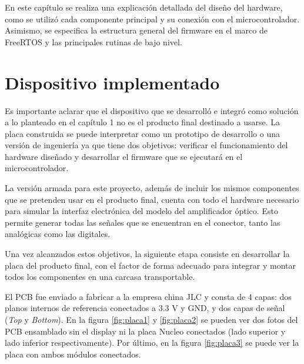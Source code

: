 
En este capítulo se realiza una explicación detallada del diseño del hardware, como se utilizó cada componente principal y su conexión con el microcontrolador. Asimismo, se especifica la estructura general del firmware en el marco de FreeRTOS y las principales rutinas de bajo nivel.

\section{Dispositivo implementado}

Es importante aclarar que el dispositivo que se desarrolló e integró como solución a lo planteado en el capítulo 1 no es el producto final destinado a usarse. La placa construida se puede interpretar como un prototipo de desarrollo o una versión de ingeniería ya que tiene dos objetivos: verificar el funcionamiento del hardware diseñado y desarrollar el firmware que se ejecutará en el microcontrolador. 

La versión armada para este proyecto, además de incluir los mismos componentes que se pretenden usar en el producto final, cuenta con todo el hardware necesario para simular la interfaz electrónica del modelo del amplificador óptico. Esto permite generar todas las señales que se encuentran en el conector, tanto las analógicas como las digitales.

Una vez alcanzados estos objetivos, la siguiente etapa consiste en desarrollar la placa del producto final, con el factor de forma adecuado para integrar y montar todos los componentes en una carcasa transportable. 

El PCB fue enviado a fabricar a la empresa china JLC y consta de 4 capas: dos planos internos de referencia conectados a 3.3 V y GND, y dos capas de señal (\textit{Top} y \textit{Bottom}). En la figura \ref{fig:placa1} y \ref{fig:placa2} se pueden ver dos fotos del PCB ensamblado sin el display ni la placa Nucleo conectados (lado superior y lado inferior respectivamente). Por último, en la figura \ref{fig:placa3} se puede ver la placa con ambos módulos conectados.

